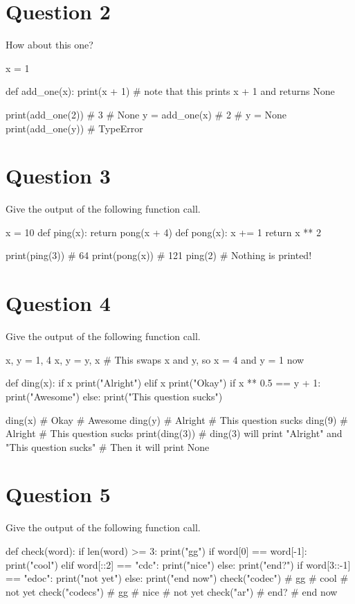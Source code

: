 \section{Question 2}
How about this one?
\begin{python}
x = 1

def add_one(x):
    print(x + 1)    # note that this prints x + 1 and returns None

print(add_one(2))   # 3
                    # None
y = add_one(x)      # 2
                    # y = None
print(add_one(y))   # TypeError
\end{python}

\section{Question 3}
Give the output of the following function call.
\begin{python}
x = 10
def ping(x):
    return pong(x + 4)
def pong(x):
    x += 1
    return x ** 2
  
print(ping(3))  # 64
print(pong(x))  # 121
ping(2)         # Nothing is printed!
\end{python}

\section{Question 4}
Give the output of the following function call.
\begin{python}
x, y = 1, 4
x, y = y, x     # This swaps x and y, so x = 4 and y = 1 now

def ding(x):
    if x %
        print("Alright")
    elif x %
        print("Okay")
    if x ** 0.5 == y + 1:
        print("Awesome")
    else:
        print("This question sucks")

ding(x)         # Okay
                # Awesome
ding(y)         # Alright
                # This question sucks
ding(9)         # Alright
                # This question sucks
print(ding(3))  # ding(3) will print "Alright" and "This question sucks"
                # Then it will print None
\end{python}

\section{Question 5}
Give the output of the following function call.
\begin{python}
def check(word):
    if len(word) >= 3:
        print("gg")
    if word[0] == word[-1]:
        print("cool")
    elif word[::2] == "cdc":
        print("nice")
    else:
        print("end?")
    if word[3::-1] == "edoc":
        print("not yet")
    else:
        print("end now")
check("codec")      # gg
                    # cool
                    # not yet
check("codecs")     # gg
                    # nice
                    # not yet
check("ar")         # end?
                    # end now
\end{python}

